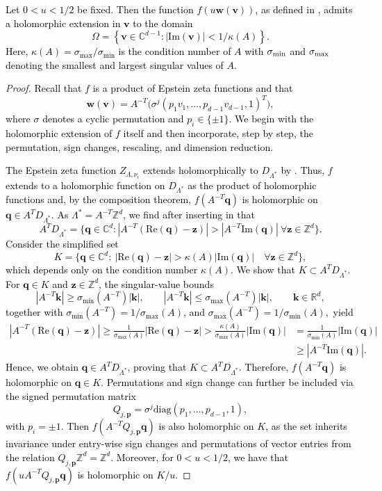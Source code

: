\documentclass[]{amsart}
\numberwithin{mythm}{section}
\renewcommand{\Re}[1]{\mathrm{Re}(#1)}
\renewcommand{\Im}[1]{\mathrm{Im}(#1)}
\newcommand{\new}[1]{{\textcolor{black}{#1}}}
\begin{document}
\new{
\begin{corollary}
\label{hol-integrand}
Let $0<u<1/2$ be fixed. Then the function $f(u\bm w(\bm v))$, as defined in \Cref{duffy}, admits a holomorphic extension in $\bm v$ to the domain
\[
\Omega=\left\{\bm v\in \mathds C^{d-1} : |\Im{\bm v}| < 1/\kappa(A)\right\}.
\]
Here, $\kappa(A)=\sigma_\mathrm{max}/\sigma_\mathrm{min}$ is the condition number of $A$ with
$\sigma_{\rm min}$ and $\sigma_{\rm max}$ denoting the smallest and largest singular values of $A$.
\end{corollary}
}
\begin{proof}
\new{Recall that \(f\) is a product of Epstein zeta functions and that
\[
\bm w(\bm v)
=
A^{-T}\bigl(\sigma^j(p_1v_1,\dots,p_{d-1}v_{d-1},1)^T\bigr),
\]
where \(\sigma\) denotes a cyclic permutation and \(p_i\in\{\pm1\}\). We begin with the holomorphic extension of \(f\) itself and then incorporate, step by step, the permutation, sign changes, rescaling, and dimension reduction.}

\new{The Epstein zeta function $Z_{\Lambda,\nu_i}$ extends holomorphically to $D_{\Lambda^*}$ by \Cref{holreg}. Thus, $f$ extends to a holomorphic function on $D_{\Lambda^*}$
as the product of holomorphic functions and,
by the composition theorem,
$f(A^{-T} \bm q)$ is holomorphic on 
$\bm q\in 
A^TD_{\Lambda^*}$. As $\Lambda^\ast=A^{-T} \mathds Z^d$, we find after inserting in \Cref{holreg} that
\[
A^T D_{\Lambda^*}=\{\bm q\in\mathds C^d:|A^{-T}(\Re{\bm q}-\bm z)|>|A^{-T}\Im{\bm q}|\ \forall \bm z\in \mathds Z^d\}.
\]}
\new{Consider the simplified set
\[
K
=
\{\bm q\in\mathds C^d:\ |\Re{\bm q}-\bm z|>\kappa(A)|\Im{\bm q}|
\quad \forall \bm z\in\mathds Z^d\},
\]
which depends only on the condition number \(\kappa(A)\). We show that $K\subset A^T D_{\Lambda^\ast}$.
For \(\bm q\in K\) and \(\bm z\in\mathds Z^d\), the singular-value bounds
\[
|A^{-T}\bm k|\ge \sigma_{\min}(A^{-T})|\bm k|,
\qquad
|A^{-T}\bm k|\le \sigma_{\max}(A^{-T})|\bm k|,
\qquad \bm k\in\mathds R^d,
\]
together with
$
\sigma_{\min}(A^{-T})=1/\sigma_{\max}(A)$, and
$
\sigma_{\max}(A^{-T})=1/\sigma_{\min}(A),
$
yield
\begin{align*}
|A^{-T}(\Re{\bm q}-\bm z)|
\ge \frac{1}{\sigma_{\max}(A)}|\Re{\bm q}-\bm z|
> \frac{\kappa(A)}{\sigma_{\max}(A)}|\Im{\bm q}|
&= \frac{1}{\sigma_{\min}(A)}|\Im{\bm q}|\\
&\ge |A^{-T}\Im{\bm q}|.
\end{align*}
Hence, we obtain \(\bm q\in A^T D_{\Lambda^\ast}\), proving that \(K\subset A^T D_{\Lambda^\ast}\). Therefore, \(f(A^{-T}\bm q)\) is holomorphic on \(\bm q\in K\).
Permutations and sign change can further be included via the signed permutation matrix \[Q_{j,\bm p}=\sigma^j \mathrm{diag}(p_1,\dots,p_{d-1},1),\] with $p_i= \pm 1$. Then $f(A^{-T} Q_{j,\bm p}\bm q)$ is also holomorphic on $K$, as the set inherits invariance under entry-wise sign changes and permutations of vector entries from the relation $Q_{j,\bm p}\mathds Z^d =\mathds Z^d$. Moreover, for $0<u<1/2$, we have that $f(u A^{-T} Q_{j,\bm p}\bm q)$ is holomorphic on $K/u$.}


\end{proof}
\end{document}
